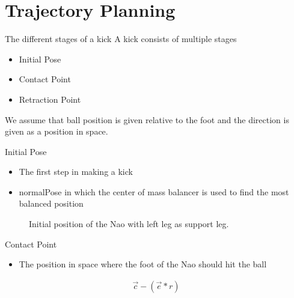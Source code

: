 \documentclass{beamer}
\begin{document}
\section{Trajectory Planning}
\begin{frame}{The different stages of a kick}
    A kick consists of multiple stages
    \begin{itemize}
        \item Initial Pose
        \item Contact Point
        \item Retraction Point
    \end{itemize}
    We assume that ball position is given relative to the foot and the direction
    is given as a position in space.
\end{frame}

\begin{frame}{Initial Pose}
    \begin{itemize}
        \item The first step in making a kick
        \item normalPose in which the center of mass balancer is used to find
            the most balanced position
    \end{itemize}

    \begin{figure}[htbp]
      \centering
      \caption{Initial position of the Nao with left leg as support leg.}
    \end{figure}
\end{frame}

\begin{frame}{Contact Point}
    \begin{itemize}
        \item The position in space where the foot of the Nao should hit the ball
    \end{itemize}

    \begin{align*}
        \vec{c} - ( \vec{e} * r )
    \end{align*}
\end{frame}
\end{document}
